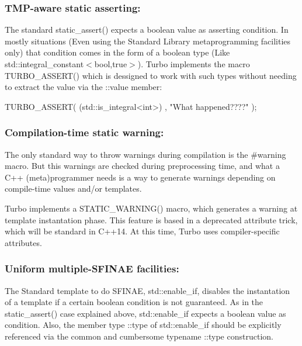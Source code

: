 \subsubsection*{T\+M\+P-\/aware static asserting\+:}

The standard {\ttfamily static\+\_\+assert()} expects a boolean value as asserting condition. In mostly situations (Even using the Standard Library metaprogramming facilities only) that condition comes in the form of a boolean type (Like {\ttfamily std\+::integral\+\_\+constant$<$bool,true$>$}). Turbo implements the macro {\ttfamily T\+U\+R\+B\+O\+\_\+\+A\+S\+S\+E\+R\+T()} which is dessigned to work with such types without needing to extract the value via the {\ttfamily \+::value} member\+: \begin{DoxyVerb}TURBO_ASSERT( (std::is_integral<int>) , "What happened????" );
\end{DoxyVerb}


\subsubsection*{Compilation-\/time static warning\+:}

The only standard way to throw warnings during compilation is the {\ttfamily \#warning} macro. But this warnings are checked during preprocessing time, and what a C++ (meta)programmer needs is a way to generate warnings depending on compile-\/time values and/or templates.

Turbo implements a {\ttfamily S\+T\+A\+T\+I\+C\+\_\+\+W\+A\+R\+N\+I\+N\+G()} macro, which generates a warning at template instantation phase. This feature is based in a {\ttfamily deprecated} attribute trick, which will be standard in C++14. At this time, Turbo uses compiler-\/specific attributes.

\subsubsection*{Uniform multiple-\/\+S\+F\+I\+N\+A\+E facilities\+:}

The Standard template to do S\+F\+I\+N\+A\+E, {\ttfamily std\+::enable\+\_\+if}, disables the instantation of a template if a certain boolean condition is not guaranteed. As in the {\ttfamily static\+\_\+assert()} case explained above, {\ttfamily std\+::enable\+\_\+if} expects a boolean value as condition. Also, the member type {\ttfamily \+::type} of {\ttfamily std\+::enable\+\_\+if} should be explicitly referenced via the common and cumbersome {\ttfamily typename \+::type} construction.

